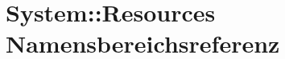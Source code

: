 \hypertarget{namespaceSystem_1_1Resources}{
\section{System::Resources Namensbereichsreferenz}
\label{namespaceSystem_1_1Resources}
}




